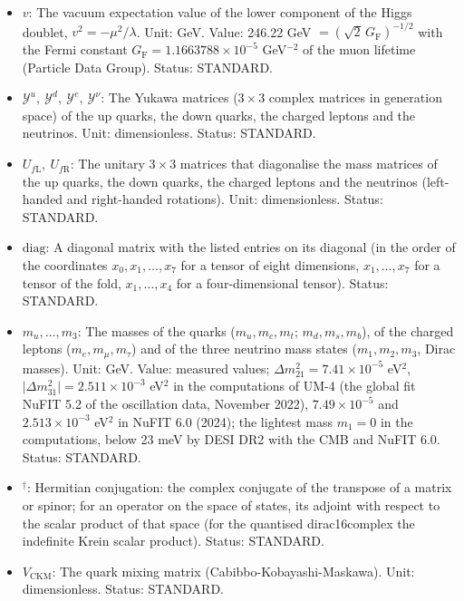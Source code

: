 \documentclass[
  10pt,
]{article}
\providecommand{\tightlist}{%
  \setlength{\itemsep}{0pt}\setlength{\parskip}{0pt}}
\begin{document}
\begin{itemize}
\tightlist
\item
  \(v\): The vacuum expectation value of the lower component of the
  Higgs doublet, \(v^2 = -\mu^2/\lambda\). Unit: GeV. Value: 246.22 GeV
  \(= (\sqrt2\,G_{\mathrm{F}})^{-1/2}\) with the Fermi constant
  \(G_{\mathrm{F}} = 1.1663788\times10^{-5}\) GeV\(^{-2}\) of the muon
  lifetime (Particle Data Group). Status: STANDARD.
\item
  \(\mathcal{Y}^{u},\ \mathcal{Y}^{d},\ \mathcal{Y}^{e},\ \mathcal{Y}^{\nu}\):
  The Yukawa matrices (\(3 \times 3\) complex matrices in generation
  space) of the up quarks, the down quarks, the charged leptons and the
  neutrinos. Unit: dimensionless. Status: STANDARD.
\item
  \(U_{f\mathrm{L}},\ U_{f\mathrm{R}}\): The unitary \(3 \times 3\)
  matrices that diagonalise the mass matrices of the up quarks, the down
  quarks, the charged leptons and the neutrinos (left-handed and
  right-handed rotations). Unit: dimensionless. Status: STANDARD.
\item
  \(\mathrm{diag}\): A diagonal matrix with the listed entries on its
  diagonal (in the order of the coordinates \(x_0, x_1, \dots, x_7\) for
  a tensor of eight dimensions, \(x_1, \dots, x_7\) for a tensor of the
  fold, \(x_1, \dots, x_4\) for a four-dimensional tensor). Status:
  STANDARD.
\item
  \(m_u, \dots, m_3\): The masses of the quarks (\(m_u, m_c, m_t\);
  \(m_d, m_s, m_b\)), of the charged leptons (\(m_e, m_\mu, m_\tau\))
  and of the three neutrino mass states (\(m_1, m_2, m_3\), Dirac
  masses). Unit: GeV. Value: measured values;
  \(\Delta m_{21}^2 = 7.41\times10^{-5}\) eV\(^2\),
  \(\lvert\Delta m_{31}^2\rvert = 2.511\times10^{-3}\) eV\(^2\) in the
  computations of UM-4 (the global fit NuFIT 5.2 of the oscillation
  data, November 2022), \(7.49\times10^{-5}\) and \(2.513\times10^{-3}\)
  eV\(^2\) in NuFIT 6.0 (2024); the lightest mass \(m_1 = 0\) in the
  computations, below 23 meV by DESI DR2 with the CMB and NuFIT 6.0.
  Status: STANDARD.
\item
  \({}^\dagger\): Hermitian conjugation: the complex conjugate of the
  transpose of a matrix or spinor; for an operator on the space of
  states, its adjoint with respect to the scalar product of that space
  (for the quantised dirac16complex the indefinite Krein scalar
  product). Status: STANDARD.
\item
  \(V_{\mathrm{CKM}}\): The quark mixing matrix
  (Cabibbo-Kobayashi-Maskawa). Unit: dimensionless. Status: STANDARD.

\end{itemize}
\end{document}
